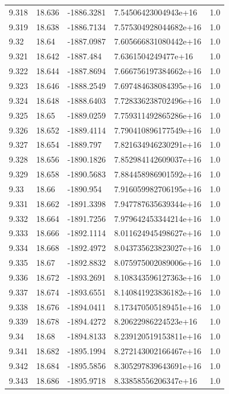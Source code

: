 \begin{tabular}{lllll}
9.318 & 18.636 & -1886.3281 & 7.54506423004943e+16 & 1.0 \\
9.319 & 18.638 & -1886.7134 & 7.575304928044682e+16 & 1.0 \\
9.32 & 18.64 & -1887.0987 & 7.605666831080442e+16 & 1.0 \\
9.321 & 18.642 & -1887.484 & 7.6361504249477e+16 & 1.0 \\
9.322 & 18.644 & -1887.8694 & 7.666756197384662e+16 & 1.0 \\
9.323 & 18.646 & -1888.2549 & 7.697484638084395e+16 & 1.0 \\
9.324 & 18.648 & -1888.6403 & 7.728336238702496e+16 & 1.0 \\
9.325 & 18.65 & -1889.0259 & 7.759311492865286e+16 & 1.0 \\
9.326 & 18.652 & -1889.4114 & 7.790410896177549e+16 & 1.0 \\
9.327 & 18.654 & -1889.797 & 7.821634946230291e+16 & 1.0 \\
9.328 & 18.656 & -1890.1826 & 7.852984142609037e+16 & 1.0 \\
9.329 & 18.658 & -1890.5683 & 7.884458986901592e+16 & 1.0 \\
9.33 & 18.66 & -1890.954 & 7.916059982706195e+16 & 1.0 \\
9.331 & 18.662 & -1891.3398 & 7.947787635639344e+16 & 1.0 \\
9.332 & 18.664 & -1891.7256 & 7.979642453344214e+16 & 1.0 \\
9.333 & 18.666 & -1892.1114 & 8.011624945498627e+16 & 1.0 \\
9.334 & 18.668 & -1892.4972 & 8.043735623823027e+16 & 1.0 \\
9.335 & 18.67 & -1892.8832 & 8.075975002089006e+16 & 1.0 \\
9.336 & 18.672 & -1893.2691 & 8.108343596127363e+16 & 1.0 \\
9.337 & 18.674 & -1893.6551 & 8.140841923836182e+16 & 1.0 \\
9.338 & 18.676 & -1894.0411 & 8.173470505189451e+16 & 1.0 \\
9.339 & 18.678 & -1894.4272 & 8.20622986224523e+16 & 1.0 \\
9.34 & 18.68 & -1894.8133 & 8.239120519153811e+16 & 1.0 \\
9.341 & 18.682 & -1895.1994 & 8.272143002166467e+16 & 1.0 \\
9.342 & 18.684 & -1895.5856 & 8.305297839643691e+16 & 1.0 \\
9.343 & 18.686 & -1895.9718 & 8.33858556206347e+16 & 1.0 \\

\end{tabular}
